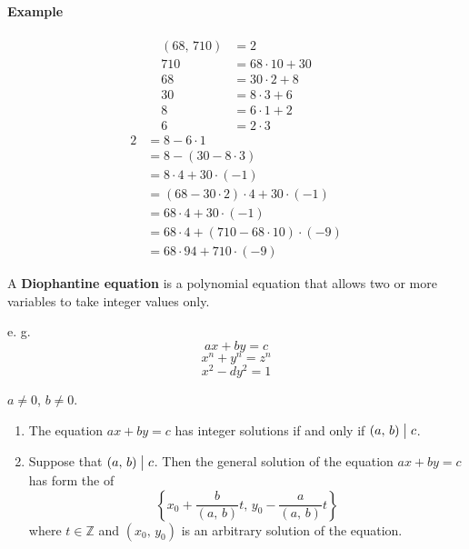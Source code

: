 \paragraph{Example}
\begin{align*}
    \left(68,\,710\right) &= 2 \\
    710 &= 68 \cdot 10 + 30 \\
    68 &= 30 \cdot 2 + 8 \\
    30 &= 8 \cdot 3 + 6 \\
    8 &= 6 \cdot 1 + 2 \\
    6 &= 2 \cdot 3
\end{align*}
\begin{align*}
    2 &= 8 - 6\cdot 1 \\
    &= 8 - \left(30 - 8 \cdot 3\right) \\
    &= 8 \cdot 4 + 30 \cdot \left(-1\right) \\
    &= \left(68-30\cdot 2\right) \cdot 4 + 30\cdot\left(-1\right) \\
    &= 68 \cdot 4 + 30 \cdot \left(-1\right) \\
    &= 68 \cdot 4 + \left(710 - 68 \cdot 10\right) \cdot \left(-9\right) \\
    &= 68 \cdot 94 + 710 \cdot \left(-9\right)
\end{align*}

\begin{definition}
    A \textbf{Diophantine equation} is a polynomial equation that allows two or more variables
    to take integer values only.
\end{definition}

e. g.
\[ax+by=c\] \[x^n+y^n=z^n\] \[x^2-dy^2=1\]

\begin{theorem}
    $a\neq 0$, $b\neq 0$.
    \begin{enumerate}
        \item The equation $ax+by=c$ has integer solutions if and only if
        $\left(a,\,b\right) \bigm| c$.
        \item Suppose that $\left(a,\,b\right) \bigm| c$.
        Then the general solution of the equation $ax+by=c$ has form the of
        \[
            \left\{x_0 + \frac{b}{\left(a,\,b\right)}t,\, y_0 - \frac{a}{\left(a,\,b\right)}t\right\}    
        \]
        where $t \in \mathbb{Z}$ and $\left(x_0,\,y_0\right)$ is an arbitrary solution of the equation.
    \end{enumerate}
\end{theorem}

